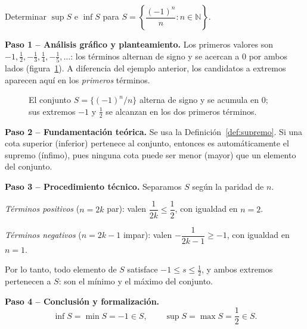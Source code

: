 \begin{example} Determinar $\sup S$ e $\inf S$ para
$S = \left\{\dfrac{(-1)^n}{n} : n \in \mathbb{N}\right\}$.

\begin{myproof}
\textbf{Paso 1 – Análisis gráfico y planteamiento.}
Los primeros valores son $-1, \tfrac{1}{2}, -\tfrac{1}{3}, \tfrac{1}{4},
-\tfrac{1}{5},\ldots$: los términos alternan de signo y se acercan a $0$
por ambos lados (figura~\ref{fig:supremo_alternante}). A diferencia del
ejemplo anterior, los candidatos a extremos aparecen aquí en los
\emph{primeros} términos.

\begin{figure}[H]
\centering
{}
\caption{El conjunto $S = \{(-1)^n/n\}$ alterna de signo y se acumula en
$0$; sus extremos $-1$ y $\tfrac{1}{2}$ se alcanzan en los dos primeros
términos.}
\label{fig:supremo_alternante}
\end{figure}

\textbf{Paso 2 – Fundamentación teórica.}
Se usa la Definición~\ref{def:supremo}. Si una cota superior (inferior)
pertenece al conjunto, entonces es automáticamente el supremo (ínfimo),
pues ninguna cota puede ser menor (mayor) que un elemento del conjunto.

\textbf{Paso 3 – Procedimiento técnico.}
Separamos $S$ según la paridad de $n$.

\emph{Términos positivos} ($n = 2k$ par): valen $\dfrac{1}{2k} \leq
\dfrac{1}{2}$, con igualdad en $n = 2$.

\emph{Términos negativos} ($n = 2k-1$ impar): valen
$-\dfrac{1}{2k-1} \geq -1$, con igualdad en $n = 1$.

Por lo tanto, todo elemento de $S$ satisface $-1 \leq s \leq \tfrac{1}{2}$,
y ambos extremos pertenecen a $S$: son el mínimo y el máximo del conjunto.

\textbf{Paso 4 – Conclusión y formalización.}
\[
   \boxed{\inf S = \min S = -1 \in S, \qquad
   \sup S = \max S = \frac{1}{2} \in S.}
\]
\end{myproof}
\end{example}

